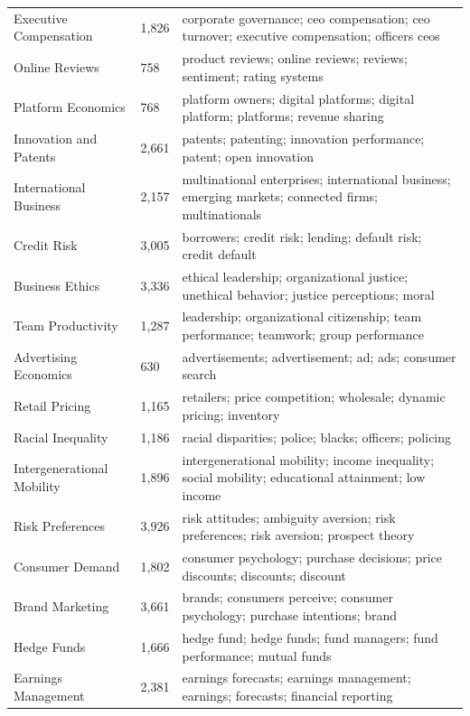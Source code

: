 \documentclass[11pt]{article}
\begin{document}
\begin{longtable}{p{}p{}p{}}
Executive Compensation & 1,826 & corporate governance; ceo compensation; ceo turnover; executive compensation; officers ceos \\
Online Reviews & 758 & product reviews; online reviews; reviews; sentiment; rating systems \\
Platform Economics & 768 & platform owners; digital platforms; digital platform; platforms; revenue sharing \\
Innovation and Patents & 2,661 & patents; patenting; innovation performance; patent; open innovation \\
International Business & 2,157 & multinational enterprises; international business; emerging markets; connected firms; multinationals \\
Credit Risk & 3,005 & borrowers; credit risk; lending; default risk; credit default \\
Business Ethics & 3,336 & ethical leadership; organizational justice; unethical behavior; justice perceptions; moral \\
Team Productivity & 1,287 & leadership; organizational citizenship; team performance; teamwork; group performance \\
Advertising Economics & 630 & advertisements; advertisement; ad; ads; consumer search \\
Retail Pricing & 1,165 & retailers; price competition; wholesale; dynamic pricing; inventory \\
Racial Inequality & 1,186 & racial disparities; police; blacks; officers; policing \\
Intergenerational Mobility & 1,896 & intergenerational mobility; income inequality; social mobility; educational attainment; low income \\
Risk Preferences & 3,926 & risk attitudes; ambiguity aversion; risk preferences; risk aversion; prospect theory \\
Consumer Demand & 1,802 & consumer psychology; purchase decisions; price discounts; discounts; discount \\
Brand Marketing & 3,661 & brands; consumers perceive; consumer psychology; purchase intentions; brand \\
Hedge Funds & 1,666 & hedge fund; hedge funds; fund managers; fund performance; mutual funds \\
Earnings Management & 2,381 & earnings forecasts; earnings management; earnings; forecasts; financial reporting \\
\bottomrule
\end{longtable}
\endgroup
\end{document}
